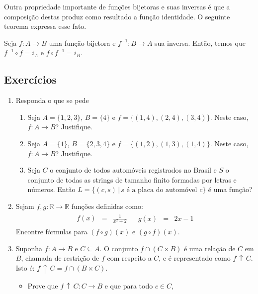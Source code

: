 Outra propriedade importante de funções bijetoras e suas inversas é
que a composição destas produz como resultado a função identidade. O
seguinte teorema expressa esse fato.

\begin{Theorem}\label{thm-inversa}
Seja $f : A \to B$ uma função bijetora e $f^{-1} : B \to A$ sua
inversa. Então, temos que $f^{-1} \circ f = i_{A}$ e $f \circ f^{-1}  = i_{B}$.
\end{Theorem}
\subsection{Exercícios}
\begin{enumerate}
  \item Responda o que se pede
  \begin{enumerate}
    \item Seja $A=\{1,2,3\}$, $B = \{4\}$ e $f =
      \{(1,4),(2,4),(3,4)\}$. Neste caso, $f : A \to B$? Justifique.
    \item Seja $A=\{1\}$, $B = \{2,3,4\}$ e $f =
      \{(1,2),(1,3),(1,4)\}$. Neste caso, $f : A \to B$? Justifique.
    \item Seja $C$ o conjunto de todos autom\'oveis registrados no Brasil e
      $S$ o conjunto de todas as strings de tamanho finito formadas por letras
      e n\'umeros. Ent\~ao $L = \{(c,s)\,|\,s\text{ \'e a placa do autom\'ovel
      }c\}$ \'e uma fun\c{c}\~ao?
  \end{enumerate}
  \item Sejam $f, g : \mathbb{R}\to \mathbb{R}$ fun\c{c}\~oes definidas como:
  \[
  \begin{array}{cc}
    \begin{array}{rcl}
      f(x) & = & \frac{1}{x^2 +2}
    \end{array} &
    \begin{array}{rcl}
      g(x) & = & 2x - 1
    \end{array}
  \end{array}
  \]
  Encontre f\'ormulas para $(f\circ g)(x)$ e $(g \circ f)(x)$.
  \item Suponha $f : A \to B$ e $C \subseteq A$. O conjunto $f\cap (C \times
    B)$ \'e uma rela\c{c}\~ao de $C$ em $B$, chamada de restri\c{c}\~ao de $f$
    com respeito a $C$, e \'e representado como $f\,\uparrow\,C$. Isto \'e:
    $f\,\uparrow\,C = f\cap (B\times C)$.
  \begin{itemize}
    \item Prove que $f\,\uparrow\,C : C \to B$ e que para todo $c \in C$,

\end{itemize}
\end{enumerate}
